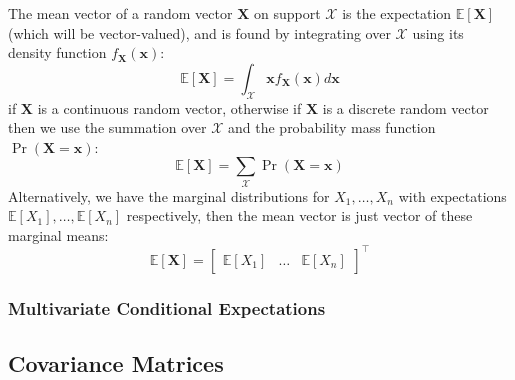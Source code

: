 \documentclass[11pt]{report} %
\begin{document}
The mean vector of a random vector $\mathbf{X}$ on support $\mathcal{X}$ is the expectation $\mathbb{E}\left[\mathbf{X}\right]$ (which will be vector-valued), and is found by integrating over $\mathcal{X}$ using its density function $f_{\mathbf{X}}\left(\mathbf{x}\right)$:
\begin{equation}
\mathbb{E}\left[\mathbf{X}\right] = \int_{\mathcal{X}}\mathbf{x}f_{\mathbf{X}}\left(\mathbf{x}\right)d\mathbf{x}
\end{equation}
if $\mathbf{X}$ is a continuous random vector, otherwise if $\mathbf{X}$ is a discrete random vector then we use the summation over $\mathcal{X}$ and the probability mass function $\operatorname{Pr}\left(\mathbf{X} = \mathbf{x}\right)$:
\begin{equation}
\mathbb{E}\left[\mathbf{X}\right] = \sum_{\mathcal{X}}\operatorname{Pr}\left(\mathbf{X} = \mathbf{x}\right)
\end{equation}
Alternatively, we have the marginal distributions for $X_{1}, \dots, X_{n}$ with expectations $\mathbb{E}\left[X_{1}\right], \dots, \mathbb{E}\left[X_{n}\right]$ respectively, then the mean vector is just vector of these marginal means:
\begin{equation}
\mathbb{E}\left[\mathbf{X}\right] = \begin{bmatrix}
\mathbb{E}\left[X_{1}\right] & \dots & \mathbb{E}\left[X_{n}\right]
\end{bmatrix}^{\top}
\end{equation}

\subsubsection{Multivariate Conditional Expectations}

\subsection{Covariance Matrices}
\end{document}

